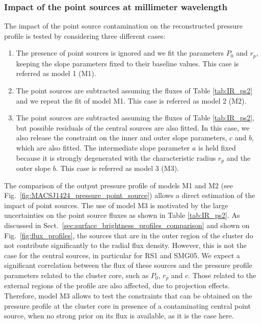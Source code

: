 \documentclass[twocolumn,traditabstract]{aa}
\begin{document}
\subsubsection{Impact of the point sources at millimeter wavelength}
The impact of the point source contamination on the reconstructed pressure profile is tested by considering three different cases: 
\begin{enumerate}
\item The presence of point sources is ignored and we fit the parameters $P_0$ and $r_p$, keeping the slope parameters fixed to their baseline values. This case is referred as model 1 (M1).
\item The point sources are subtracted assuming the fluxes of Table \ref{tab:IR_ps2} and we repeat the fit of model M1. This case is referred as model 2 (M2).
\item The point sources are subtracted assuming the fluxes of Table \ref{tab:IR_ps2}, but possible residuals of the central sources are also fitted. In this case, we also release the constraint on the inner and outer slope parameters, $c$ and $b$, which are also fitted. The intermediate slope parameter $a$ is held fixed because it is strongly degenerated with the characteristic radius $r_p$ and the outer slope $b$. This case is referred as model 3 (M3).
\end{enumerate}
The comparison of the output pressure profile of models M1 and M2 (see Fig.~\ref{fig:MACSJ1424_pressure_point_source}) allows a direct estimation of the impact of point sources. The use of model M3 is motivated by the large uncertainties on the point source fluxes as shown in Table \ref{tab:IR_ps2}. As discussed in Sect.~\ref{sec:surface_brightness_profiles_comparison} and shown on Fig.~\ref{fig:flux_profiles}, the sources that are in the outer region of the cluster do not contribute significantly to the radial flux density. However, this is not the case for the central sources, in particular for RS1 and SMG05. We expect a significant correlation between the flux of these sources and the pressure profile parameters related to the cluster core, such as $P_0$, $r_p$ and $c$. Those related to the external regions of the profile are also affected, due to projection effects. Therefore, model M3 allows to test the constraints that can be obtained on the pressure profile at the cluster core in presence of a contaminating central point source, when no strong prior on its flux is available, as it is the case here.
\end{document}
